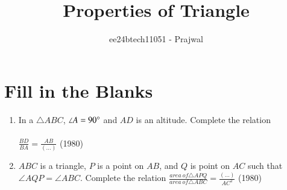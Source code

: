 \documentclass[journal,12pt,twocolumn]{IEEEtran}
\theoremstyle{remark}
\begin{document}

\vspace{3cm}

\title{Properties of Triangle}
\author{ee24btech11051 - Prajwal}
\maketitle
\newpage
\bigskip

\renewcommand{\thefigure}{\theenumi}
\renewcommand{\thetable}{\theenumi}
\section{Fill in the Blanks}
\begin{enumerate}
    \item In a $\triangle ABC$, $\angle A=90\degree$ and $AD$ is an altitude. Complete the relation\\
    \\
    $\frac{BD}{BA} = \frac{AB}{(\dots)}$
    \hfill (1980)
    
    \item $ABC$ is a triangle, $P$ is a point on $AB$, and $Q$ is point on $AC$ such that $\angle AQP = \angle ABC$. Complete the relation
    $\frac{area\ of \triangle APQ}{area\ of \triangle ABC} =\frac{(\dots)}{AC^2}$
    \hfill (1980)
    

\end{enumerate}
\end{document}

